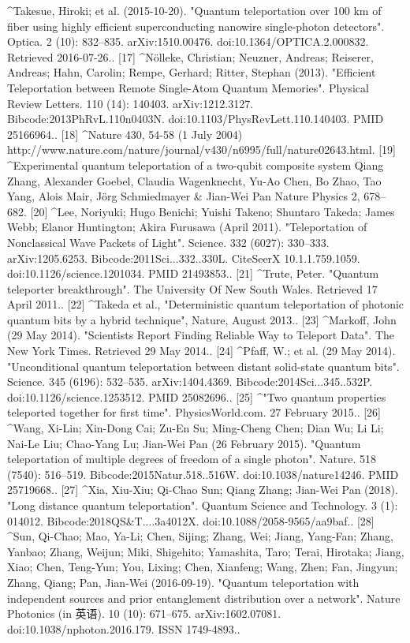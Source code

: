 \begin{enumerate}
[16]
^Takesue, Hiroki; et al. (2015-10-20). "Quantum teleportation over 100 km of fiber using highly efficient superconducting nanowire single-photon detectors". Optica. 2 (10): 832–835. arXiv:1510.00476. doi:10.1364/OPTICA.2.000832. Retrieved 2016-07-26..
[17]
^Nölleke, Christian; Neuzner, Andreas; Reiserer, Andreas; Hahn, Carolin; Rempe, Gerhard; Ritter, Stephan (2013). "Efficient Teleportation between Remote Single-Atom Quantum Memories". Physical Review Letters. 110 (14): 140403. arXiv:1212.3127. Bibcode:2013PhRvL.110n0403N. doi:10.1103/PhysRevLett.110.140403. PMID 25166964..
[18]
^Nature 430, 54-58 (1 July 2004) http://www.nature.com/nature/journal/v430/n6995/full/nature02643.html.
[19]
^Experimental quantum teleportation of a two-qubit composite system Qiang Zhang, Alexander Goebel, Claudia Wagenknecht, Yu-Ao Chen, Bo Zhao, Tao Yang, Alois Mair, Jörg Schmiedmayer & Jian-Wei Pan Nature Physics 2, 678–682.
[20]
^Lee, Noriyuki; Hugo Benichi; Yuishi Takeno; Shuntaro Takeda; James Webb; Elanor Huntington; Akira Furusawa (April 2011). "Teleportation of Nonclassical Wave Packets of Light". Science. 332 (6027): 330–333. arXiv:1205.6253. Bibcode:2011Sci...332..330L. CiteSeerX 10.1.1.759.1059. doi:10.1126/science.1201034. PMID 21493853..
[21]
^Trute, Peter. "Quantum teleporter breakthrough". The University Of New South Wales. Retrieved 17 April 2011..
[22]
^Takeda et al., "Deterministic quantum teleportation of photonic quantum bits by a hybrid technique", Nature, August 2013..
[23]
^Markoff, John (29 May 2014). "Scientists Report Finding Reliable Way to Teleport Data". The New York Times. Retrieved 29 May 2014..
[24]
^Pfaff, W.; et al. (29 May 2014). "Unconditional quantum teleportation between distant solid-state quantum bits". Science. 345 (6196): 532–535. arXiv:1404.4369. Bibcode:2014Sci...345..532P. doi:10.1126/science.1253512. PMID 25082696..
[25]
^"Two quantum properties teleported together for first time". PhysicsWorld.com. 27 February 2015..
[26]
^Wang, Xi-Lin; Xin-Dong Cai; Zu-En Su; Ming-Cheng Chen; Dian Wu; Li Li; Nai-Le Liu; Chao-Yang Lu; Jian-Wei Pan (26 February 2015). "Quantum teleportation of multiple degrees of freedom of a single photon". Nature. 518 (7540): 516–519. Bibcode:2015Natur.518..516W. doi:10.1038/nature14246. PMID 25719668..
[27]
^Xia, Xiu-Xiu; Qi-Chao Sun; Qiang Zhang; Jian-Wei Pan (2018). "Long distance quantum teleportation". Quantum Science and Technology. 3 (1): 014012. Bibcode:2018QS&T....3a4012X. doi:10.1088/2058-9565/aa9baf..
[28]
^Sun, Qi-Chao; Mao, Ya-Li; Chen, Sijing; Zhang, Wei; Jiang, Yang-Fan; Zhang, Yanbao; Zhang, Weijun; Miki, Shigehito; Yamashita, Taro; Terai, Hirotaka; Jiang, Xiao; Chen, Teng-Yun; You, Lixing; Chen, Xianfeng; Wang, Zhen; Fan, Jingyun; Zhang, Qiang; Pan, Jian-Wei (2016-09-19). "Quantum teleportation with independent sources and prior entanglement distribution over a network". Nature Photonics (in 英语). 10 (10): 671–675. arXiv:1602.07081. doi:10.1038/nphoton.2016.179. ISSN 1749-4893..

\end{enumerate}
